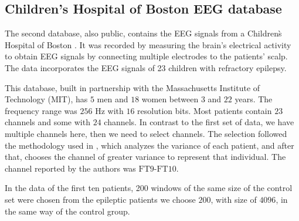 \subsection{Children's Hospital of Boston EEG database}

The second database, also public, contains the EEG signals from a Children\`s Hospital of Boston
\cite{Shoeb}. It was recorded by measuring the brain's electrical activity to obtain EEG signals by connecting multiple electrodes to the patients’ scalp. The data incorporates the EEG signals of 23 children with refractory epilepsy.

This database, built in partnership with the Massachusetts Institute of Technology (MIT), has $5$ men and $18$ women between $3$ and $22$ years. The frequency range was $256$ Hz with $16$ resolution bits. Most patients contain $ 23 $ channels and some with $24$ channels. In contrast to the first set of data, we have multiple channels here, then we need to select channels. The selection followed the methodology used in \cite{shoeb2009application}, which analyzes the variance of each patient, and after that, chooses the channel of greater variance to represent that individual. The channel reported by the authors was $\text{FT9-FT10}$.

In the data of the first ten patients, 200 windows of the same size of the control set were chosen from the epileptic patients we choose $200$, with size of $4096$, in the same way of the control group.

